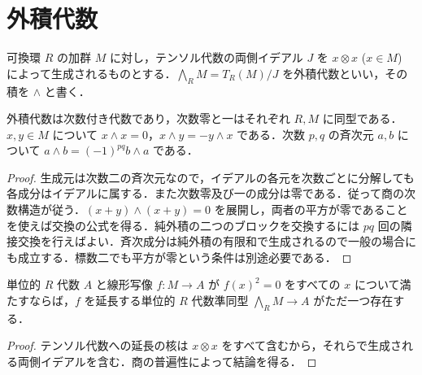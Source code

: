 \section{外積代数}
\begin{defn}[外積代数]
可換環 $R$ の加群 $M$ に対し，テンソル代数の両側イデアル $J$ を $x\otimes x$ ($x\in M$) によって生成されるものとする．$\bigwedge_R M=T_R(M)/J$ を外積代数といい，その積を $\wedge$ と書く．
\end{defn}
\begin{prop}[外積代数の次数構造]
外積代数は次数付き代数であり，次数零と一はそれぞれ $R,M$ に同型である．$x,y\in M$ について $x\wedge x=0$，$x\wedge y=-y\wedge x$ である．次数 $p,q$ の斉次元 $a,b$ について $a\wedge b=(-1)^{pq}b\wedge a$ である．
\end{prop}
\begin{proof}
生成元は次数二の斉次元なので，イデアルの各元を次数ごとに分解しても各成分はイデアルに属する．また次数零及び一の成分は零である．従って商の次数構造が従う．$(x+y)\wedge(x+y)=0$ を展開し，両者の平方が零であることを使えば交換の公式を得る．純外積の二つのブロックを交換するには $pq$ 回の隣接交換を行えばよい．斉次成分は純外積の有限和で生成されるので一般の場合にも成立する．標数二でも平方が零という条件は別途必要である．
\end{proof}
\begin{prop}[外積代数の普遍性]
単位的 $R$ 代数 $A$ と線形写像 $f:M\to A$ が $f(x)^2=0$ をすべての $x$ について満たすならば，$f$ を延長する単位的 $R$ 代数準同型 $\bigwedge_R M\to A$ がただ一つ存在する．
\end{prop}
\begin{proof}
テンソル代数への延長の核は $x\otimes x$ をすべて含むから，それらで生成される両側イデアルを含む．商の普遍性によって結論を得る．
\end{proof}
